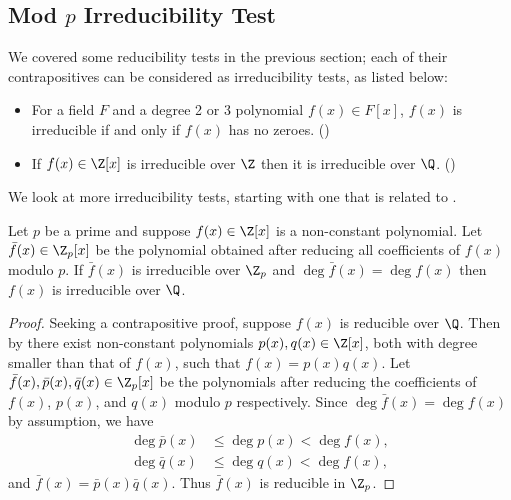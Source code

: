 \subsection{Mod $p$ Irreducibility Test}
We covered some reducibility tests in the previous section; each of their contrapositives can be considered as irreducibility tests, as listed below:
\begin{itemize}
    \item For a field $F$ and a degree 2 or 3 polynomial $f(x) \in F[x]$, $f(x)$ is irreducible if and only if $f(x)$ has no zeroes. ()
    \item If $f(x) \in \Z[x]$ is irreducible over $\Z$ then it is irreducible over $\Q$. ()
\end{itemize}
We look at more irreducibility tests, starting with one that is related to .

\begin{theorem}\label{thrm-mod-p-irreducibility-test}
    Let $p$ be a prime and suppose $f(x) \in \Z[x]$ is a non-constant polynomial. Let $\bar{f}(x) \in \Z_p[x]$ be the polynomial obtained after reducing all coefficients of $f(x)$ modulo $p$. If $\bar{f}(x)$ is irreducible over $\Z_p$ and $\deg \bar{f}(x) = \deg f(x)$ then $f(x)$ is irreducible over $\Q$.
\end{theorem}
\begin{proof}
    Seeking a contrapositive proof, suppose $f(x)$ is reducible over $\Q$. Then by  there exist non-constant polynomials $p(x), q(x) \in \Z[x]$, both with degree smaller than that of $f(x)$, such that $f(x) = p(x)q(x)$. Let $\bar{f}(x), \bar{p}(x), \bar{q}(x) \in \Z_p[x]$ be the polynomials after reducing the coefficients of $f(x)$, $p(x)$, and $q(x)$ modulo $p$ respectively. Since $\deg \bar{f}(x) = \deg f(x)$ by assumption, we have
    \begin{align*}
        \deg \bar{p}(x) &\leq \deg p(x) < \deg f(x),\\
        \deg \bar{q}(x) &\leq \deg q(x) < \deg f(x),
    \end{align*}
    and $\bar{f}(x) = \bar{p}(x)\bar{q}(x)$. Thus $\bar{f}(x)$ is reducible in $\Z_p$.
\end{proof}

